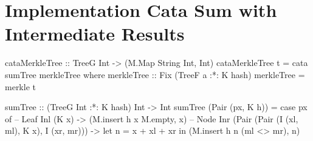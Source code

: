 \section{Implementation Cata Sum with Intermediate Results}
\label{app-impl-cata-sum-inter-results}
\begin{haskell}
cataMerkleTree :: TreeG Int -> (M.Map String Int, Int)
cataMerkleTree t = cata sumTree merkleTree
  where
    merkleTree :: Fix (TreeF a :*: K hash)
    merkleTree = merkle t

    sumTree :: (TreeG Int :*: K hash) Int -> Int
    sumTree (Pair (px, K h)) = case px of
      -- Leaf  
      Inl (K x)                       
        -> (M.insert h x M.empty, x) 
      -- Node
      Inr (Pair (Pair (I (xl, ml), K x), I (xr, mr))) 
        -> let n = x + xl + xr 
           in (M.insert h n (ml <> mr), n) 
\end{haskell}